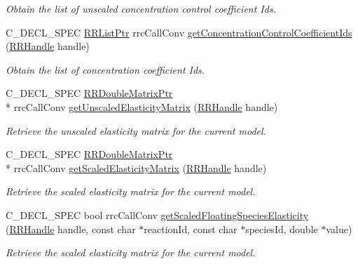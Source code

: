 \begin{DoxyCompactItemize}
\begin{DoxyCompactList}\small\item\em Obtain the list of unscaled concentration control coefficient Ids. \end{DoxyCompactList}\item 
C\-\_\-\-D\-E\-C\-L\-\_\-\-S\-P\-E\-C \hyperlink{rrc__types_8h_a32a8a60ac06858ff3a791672bd2bec73}{R\-R\-List\-Ptr} rrc\-Call\-Conv \hyperlink{group__mca_ga5d09e5709cba8b6496f3df5a17915c38}{get\-Concentration\-Control\-Coefficient\-Ids} (\hyperlink{rrc__types_8h_a1d68f0592372208fa5a5f2799ea4b3ae}{R\-R\-Handle} handle)
\begin{DoxyCompactList}\small\item\em Obtain the list of concentration coefficient Ids. \end{DoxyCompactList}\item 
C\-\_\-\-D\-E\-C\-L\-\_\-\-S\-P\-E\-C \hyperlink{rrc__types_8h_ae586a879d30f0823087e42d93464b5dd}{R\-R\-Double\-Matrix\-Ptr} \\*
rrc\-Call\-Conv \hyperlink{group__mca_ga27848ea67739637339d1c240c3d54a1b}{get\-Unscaled\-Elasticity\-Matrix} (\hyperlink{rrc__types_8h_a1d68f0592372208fa5a5f2799ea4b3ae}{R\-R\-Handle} handle)
\begin{DoxyCompactList}\small\item\em Retrieve the unscaled elasticity matrix for the current model. \end{DoxyCompactList}\item 
C\-\_\-\-D\-E\-C\-L\-\_\-\-S\-P\-E\-C \hyperlink{rrc__types_8h_ae586a879d30f0823087e42d93464b5dd}{R\-R\-Double\-Matrix\-Ptr} \\*
rrc\-Call\-Conv \hyperlink{group__mca_ga4b3e243893115cba0c1d20aa5b207343}{get\-Scaled\-Elasticity\-Matrix} (\hyperlink{rrc__types_8h_a1d68f0592372208fa5a5f2799ea4b3ae}{R\-R\-Handle} handle)
\begin{DoxyCompactList}\small\item\em Retrieve the scaled elasticity matrix for the current model. \end{DoxyCompactList}\item 
C\-\_\-\-D\-E\-C\-L\-\_\-\-S\-P\-E\-C bool rrc\-Call\-Conv \hyperlink{group__mca_gaba5b9bdc9edb663e6563e6ce836481ef}{get\-Scaled\-Floating\-Species\-Elasticity} (\hyperlink{rrc__types_8h_a1d68f0592372208fa5a5f2799ea4b3ae}{R\-R\-Handle} handle, const char $\ast$reaction\-Id, const char $\ast$species\-Id, double $\ast$value)
\begin{DoxyCompactList}\small\item\em Retrieve the scaled elasticity matrix for the current model. \end{DoxyCompactList}\item 

\end{DoxyCompactItemize}
